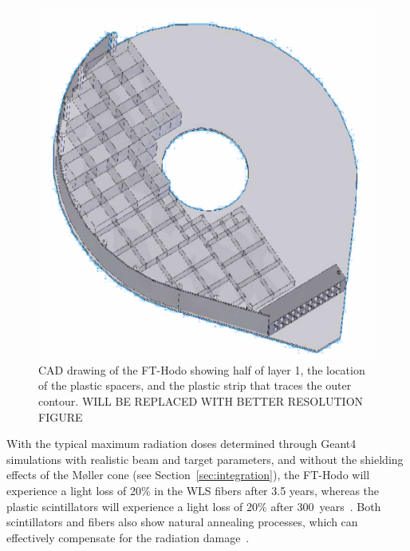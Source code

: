 \begin{figure}[th!]
\centering 
\includegraphics[width=0.85\columnwidth]{./fig/CADFT-Hodo.pdf} 
\caption{CAD drawing of the FT-Hodo showing half of layer 1, the location of the plastic spacers, and the plastic
  strip that traces the outer contour. WILL BE REPLACED WITH BETTER RESOLUTION FIGURE} 
\label{Fig:CADFT-Hodo} 
\end{figure}

With the typical maximum radiation doses determined through Geant4 simulations with realistic beam and target
parameters, and without the shielding effects of the M{\o}ller cone (see Section~\ref{sec:integration}), the
FT-Hodo will experience a light loss of 20\% in the WLS fibers after 3.5 years, whereas the plastic scintillators will
experience a light loss of 20\% after 300~years~\cite{ft-tdr}. Both scintillators and fibers also show natural
annealing processes, which can effectively compensate for the radiation damage~\cite{ft-tdr}.  

